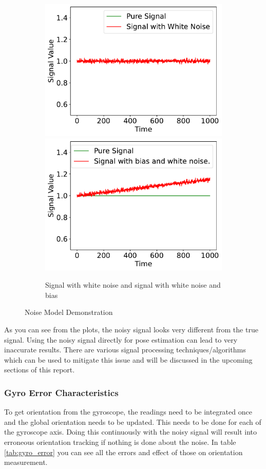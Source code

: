 \begin{figure}
  \begin{subfigure}{\linewidth}
  \includegraphics[width=.55\linewidth]{images/fig_chapter2/noise_figs/signal_white_noise.pdf}\hfill
  \includegraphics[width=.55\linewidth]{images/fig_chapter2/noise_figs/signal_white_noise_bias.pdf}
  \caption{Signal with white noise and signal with white noise and bias}
  \end{subfigure}
  
  \caption{Noise Model Demonstration}

\label{fig:imu_noise}
\end{figure}

As you can see from the plots, the noisy signal looks very different from the true signal. Using the noisy signal directly for pose estimation can lead to very inaccurate results. There are various signal processing techniques/algorithms which can be used to mitigate this issue and will be discussed in the upcoming sections of this report.

\subsubsection{Gyro Error Characteristics}
To get orientation from the gyroscope, the readings need to be integrated once and the global orientation needs to be updated. This needs to be done for each of the gyroscope axis. Doing this continuously with the noisy signal will result into erroneous  orientation tracking if nothing is done about the noise. In table \ref{tab:gyro_error} you can see all the errors and effect of those on orientation measurement.

